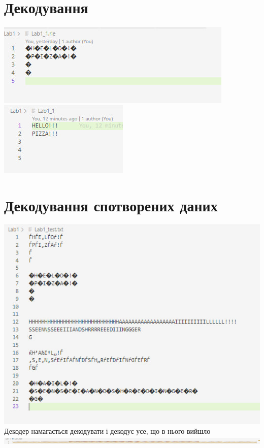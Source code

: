 \documentclass{article}
\begin{document}
\section{Декодування}
    \includegraphics{Coded.jpg}
    \newline
    \includegraphics{Decoded.jpg}

\section{Декодування спотворених даних}
    \includegraphics{Coded_Corrupt.jpg}
    \newline
    Декодер намагається декодувати і декодує усе, що в нього вийшло
    \newline
    \includegraphics{Decoded_Corrupt.png}
\end{document}

